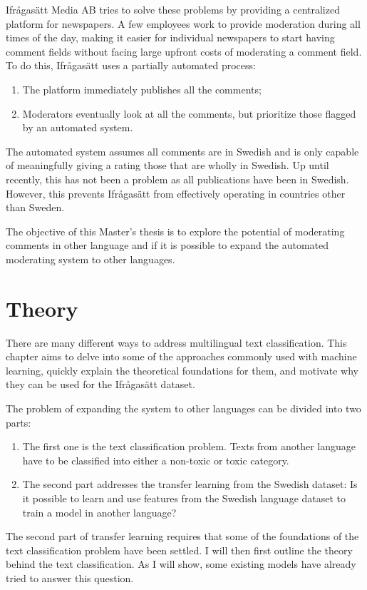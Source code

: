 \documentclass[nofilelist]{cslthse-msc}
\begin{document}
Ifrågasätt Media AB tries to solve these problems by providing a centralized platform for newspapers. A few employees work to provide moderation during all times of the day, making it easier for individual newspapers to start having comment fields without facing large upfront costs of moderating a comment field. To do this, Ifrågasätt uses a partially automated process:
\begin{enumerate}
    \item The platform immediately publishes all the comments;
    \item  Moderators eventually look at all the comments, but prioritize those flagged by an automated system.
\end{enumerate}

The automated system assumes all comments are in Swedish and is only capable of meaningfully giving a rating those that are wholly in Swedish. Up until recently, this has not been a problem as all publications have been in Swedish. However, this prevents Ifrågasätt from effectively operating in countries other than Sweden. 

The objective of this Master's thesis is to explore the potential of moderating comments in other language and if it is possible to expand the automated moderating system to other languages.


\chapter{Theory}
There are many different ways to address multilingual text classification. This chapter aims to delve into some of the approaches commonly used with machine learning, quickly explain the theoretical foundations for them, and motivate why they can be used for the Ifrågasätt dataset.

The problem of expanding the system to other languages can be divided into two parts:
\begin{enumerate}
    \item The first one is the text classification problem. Texts from another language have to be classified into either a non-toxic or toxic category. 
    \item The second part addresses the transfer learning from the Swedish dataset: Is it possible to learn and use features from the Swedish language dataset to train a model in another language? 
\end{enumerate}

The second part of transfer learning requires that some of the foundations of the text classification problem have been settled. I will then first outline the theory behind the text classification. As I will show, some existing models have already tried to answer this question. 
\end{document}
